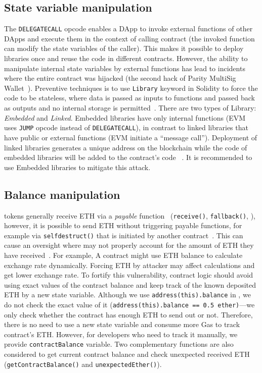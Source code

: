 \subsection{State variable manipulation}\label{subsec:svm}
The \texttt{DELEGATECALL} opcode enables a DApp to invoke external functions of other DApps and execute them in the context of calling contract (\ie the invoked function can modify the state variables of the caller). This makes it possible to deploy libraries once and reuse the code in different contracts. However, the ability to manipulate internal state variables by external functions has lead to incidents where the entire contract was hijacked (\cf the second hack of Parity MultiSig Wallet~\cite{ParitySecondHack}). Preventive techniques is to use \texttt{Library} keyword in Solidity to force the code to be stateless, where data is passed as inputs to functions and passed back as outputs and no internal storage is permitted~\cite{LIB1}. There are two types of Library: \textit{Embedded} and \textit{Linked}. Embedded libraries have only internal functions (EVM uses \texttt{JUMP} opcode instead of \texttt{DELEGATECALL}), in contrast to linked libraries that have public or external functions (EVM initiate a ``message call''). Deployment of linked libraries generates a unique address on the blockchain while the code of embedded libraries will be added to the contract's code ~\cite{LIB2}. It is recommended to use Embedded libraries to mitigate this attack.

\subsection{Balance manipulation}\label{subsec:blman}
\erc tokens generally receive ETH via a \textit{payable} function~\cite{SolidityDocPayable} (\ie \texttt{receive()}, \texttt{fallback()}, \etc), however, it is possible to send ETH without triggering payable functions, for example via \texttt{selfdestruct()} that is initiated by another contract~\cite{SolidityByExampleSelfDestruct}. This can cause an oversight where \erc may not properly account for the amount of ETH they have received~\cite{UnexpectedEth}. For example, A contract might use ETH balance to calculate exchange rate dynamically. Forcing ETH by attacker may affect calculations and get lower exchange rate. To fortify this vulnerability, contract logic should avoid using exact values of the contract balance and keep track of the known deposited ETH by a new state variable. Although we use \texttt{address(this).balance} in \sys, we do not check the exact value of it (\ie \texttt{address(this).balance == 0.5 ether)}---we only check whether the contract has enough ETH to send out or not. Therefore, there is no need to use a new state variable and consume more Gas to track contract's ETH. However, for developers who need to track it manually, we provide \texttt{contractBalance} variable. Two complementary functions are also considered to get current contract balance and check unexpected received ETH (\ie \texttt{getContractBalance()} and \texttt{unexpectedEther()}).

